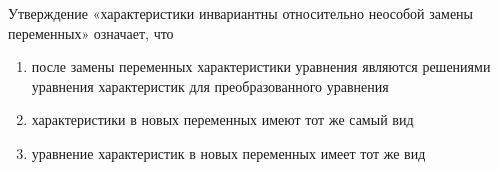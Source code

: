 Утверждение «характеристики инвариантны относительно неособой замены переменных» означает, что

\begin{enumerate}[label=\arabic*)]
    \item после замены переменных характеристики уравнения являются решениями уравнения характеристик для преобразованного уравнения
    \item характеристики в новых переменных имеют тот же самый вид
    \item уравнение характеристик в новых переменных имеет тот же вид
\end{enumerate}

